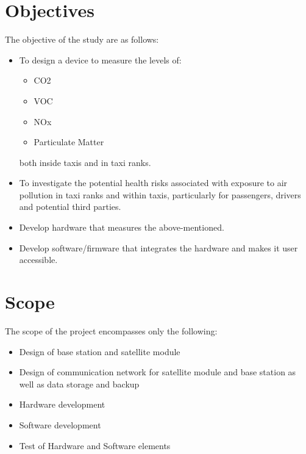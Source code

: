 \section{Objectives}
The objective of the study are as follows:
\begin{itemize}
	\item To design a device to measure the levels of:
		\begin{itemize}
			\item CO2
			\item VOC
			\item NOx
			\item Particulate Matter
		\end{itemize}
 both inside taxis and in taxi ranks.
	\item To investigate the potential health risks associated with exposure to air pollution in taxi ranks and within taxis, particularly for passengers, drivers and potential third parties.
	\item Develop hardware that measures the above-mentioned.
	\item Develop software/firmware that integrates the hardware and makes it user accessible.
\end{itemize}




\section{Scope}
The scope of the project encompasses only the following:

\begin{itemize}
	\item Design of base station and satellite module
	\item Design of communication network for satellite module and base station as well as data storage and backup
	\item Hardware development
	\item Software development
	\item Test of Hardware and Software elements
\end{itemize}

